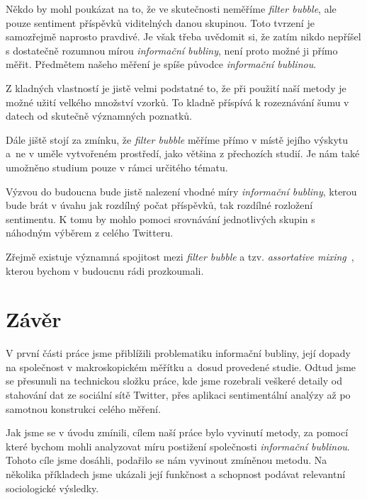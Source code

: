 \documentclass[12pt, a4paper]{article}
\numberwithin{equation}{section} 	%
\begin{document}
Někdo by mohl poukázat na to, že ve skutečnosti neměříme \textit{filter bubble}, ale pouze sentiment příspěvků viditelných danou skupinou. Toto tvrzení je samozřejmě naprosto pravdivé. Je však třeba uvědomit si, že zatím nikdo nepříšel s dostatečně rozumnou mírou \textit{informační bubliny}, není proto možné ji přímo měřit. Předmětem našeho měření je spíše původce \textit{informační bublinou}.

Z kladných vlastností je jistě velmi podstatné to, že při použití naší metody je možné užití velkého množství vzorků. To kladně příspívá k rozeznávání šumu v datech od skutečně významných poznatků.

Dále jiště stojí za zmínku, že \textit{filter bubble} měříme přímo v místě jejího výskytu a~ne v uměle vytvořeném prostředí, jako většina z přechozích studií. Je nám také umožněno studium pouze v rámci určitého tématu.

Výzvou do budoucna bude jistě nalezení vhodné míry \textit{informační bubliny}, kterou bude brát v úvahu jak rozdílný počat příspěvků, tak rozdílné rozložení sentimentu. K tomu by mohlo pomoci srovnávání jednotlivých skupin s náhodným výběrem z celého Twitteru.

Zřejmě existuje významná spojitost mezi \textit{filter bubble} a tzv. \textit{assortative mixing}~\cite{AssortativeMixing-soc, AssortativeMixing-E}, kterou bychom v budoucnu rádi prozkoumali.

\newpage
\section{Závěr}
\noindent V první části práce jsme přiblížili problematiku informační bubliny, její dopady na společnost v makroskopickém měřítku a~dosud provedené studie.  Odtud jsme se přesunuli na technickou složku práce, kde jsme rozebrali veškeré detaily od stahování dat ze sociální sítě Twitter, přes aplikaci sentimentální analýzy až po samotnou konstrukci celého měření.

Jak jsme se v úvodu zmínili, cílem naší práce bylo vyvinutí metody, za pomocí které bychom mohli analyzovat míru postižení společnosti \textit{informační bublinou}. Tohoto cíle jsme dosáhli, podařilo se nám vyvinout zmíněnou metodu. Na několika příkladech jsme ukázali její funkčnost a schopnost podávat relevantní sociologické výsledky.
\end{document}

